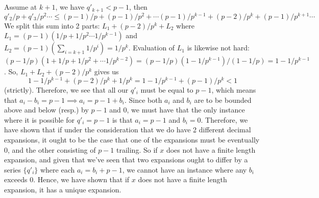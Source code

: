 \documentclass[../Main.tex]{subfiles}
\begin{document}
{\\\\ Assume at $k+1$, we have $q'_{k+1}<p-1$, then $$q'_2/p+q'_3/p^2 \cdots \leq (p-1)/p+(p-1)/p^2 + \cdots (p-1)/p^{k-1}+ (p-2)/p^{k}+ (p-1)/p^{k+1} \cdots $$ We split this sum into 2 parts: $L_1 + (p-2)/p^{k}+L_2$ where $L_1= (p-1)(1/p+1/p^2 \cdots 1/p^{k-1})$ and $L_2=(p-1)(\sum_{i=k+1}1/p^i)=1/p^k$. Evaluation of $L_1$ is likewise not hard: $(p-1/p)(1+1/p+1/p^2+\cdots 1/p^{k-2})= (p-1/p)(1-1/p^{k-1})/(1-1/p)=1-1/p^{k-1}$. So, $L_1+L_2+(p-2)/p^k$ gives us $$1-1/p^{k-1}+ (p-2)/p^k + 1/p^k=1-1/p^{k-1}+(p-1)/p^k<1$$ (strictly). Therefore, we see that all our $q'_i$ must be equal to $p-1$, which means that $a_i-b_i=p-1 \implies a_i=p-1+b_i$. Since both $a_i$ and $b_i$ are to be bounded above and below (resp.) by $p-1$ and $0$, we must have that the only instance where it is possible for $q'_i=p-1$ is that $a_i=p-1$ and $b_i=0$. Therefore, we have shown that if under the consideration that we do have 2 different decimal expansions, it ought to be the case that one of the expansions must be eventually $0$, and the other consisting of $p-1$ trailing. So if $x $ does not have a finite length expansion, and given that we've seen that two expansions ought to differ by a series $\{q'_i\}$ where each $a_i=b_i+p-1$, we cannot have an instance where any $b_i$ exceeds $0$. Hence, we have shown that if $x$ does not have a finite length expansion, it has a unique expansion.
}


\end{document}
